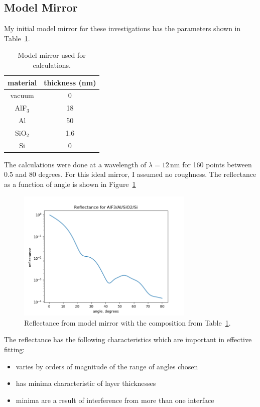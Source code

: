 \documentclass[english]{scrartcl}
\begin{document}
\subsection{Model Mirror}
My initial model mirror for these investigations has the parameters shown
in Table~\ref{tab:model-mirror}.
\begin{table}[htb]
\begin{center}
\begin{tabular}{| c | c |}\hline
material&thickness (nm)\\ \hline\hline
vacuum & 0 \\
AlF$_3$&18\\
Al&50\\
SiO$_2$&1.6\\
Si&0\\ \hline
\end{tabular}
\end{center}
\caption{\label{tab:model-mirror}Model mirror used for calculations.}
\end{table}
The calculations were done at a wavelength of $\lambda=12\,\mbox{nm}$ for
160 points between 0.5 and 80 degrees. For this ideal mirror, I assumed
no roughness. The reflectance as a function of angle is shown in
Figure~\ref{fig:model}
\begin{figure}[htb]
  \begin{center}
    \includegraphics[width=0.75\textwidth]{images/model}
  \end{center}
  \caption{\label{fig:model}Reflectance from model mirror with the
  composition from Table~\ref{tab:model-mirror}.}
\end{figure}
The reflectance has the following characteristics which are important
in effective fitting:
\begin{itemize}
\item varies by orders of magnitude of the range of angles chosen
\item has minima characteristic of layer thicknesses
\item minima are a result of interference from more than one interface
\end{itemize}
\end{document}
